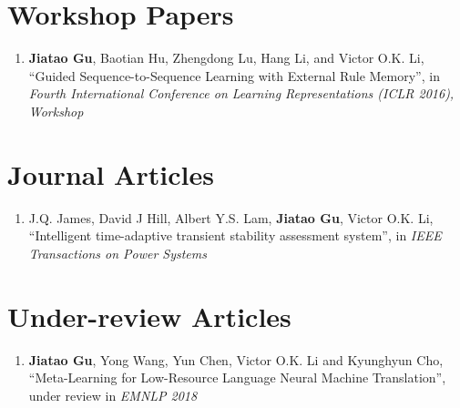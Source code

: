 

\section*{Workshop Papers}

\begin{enumerate}
	\item \textbf{Jiatao Gu}, Baotian Hu, Zhengdong Lu, Hang Li, and Victor O.K. Li, ``Guided Sequence-to-Sequence Learning with External Rule Memory'', in \emph{Fourth International Conference on Learning Representations (ICLR 2016), Workshop}
\end{enumerate}

\section*{Journal Articles}

\begin{enumerate}
	\item {J.Q. James, David J Hill, Albert Y.S. Lam, \textbf{Jiatao Gu}, Victor O.K. Li,} 	``Intelligent time-adaptive transient stability assessment system'', in \emph{IEEE Transactions on Power Systems}
\end{enumerate}

\section*{Under-review Articles}

\begin{enumerate}
	\item \textbf{Jiatao Gu}, Yong Wang, Yun Chen, Victor O.K. Li and Kyunghyun Cho, ``Meta-Learning for Low-Resource Language Neural Machine Translation'', under review in \emph{EMNLP 2018}
\end{enumerate}